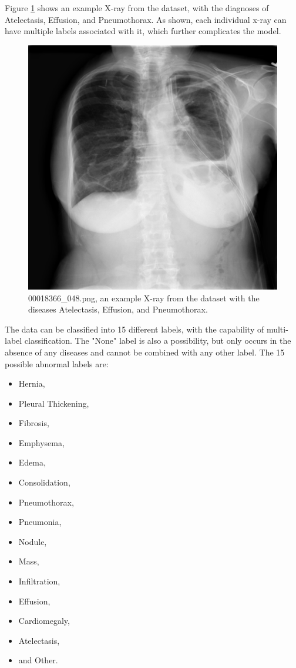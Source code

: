 \documentclass{article}
\theoremstyle{plain}
\theoremstyle{definition}
\theoremstyle{remark}
\begin{document}
Figure \ref{fig:examplexray} shows an example X-ray from the dataset, with the diagnoses of
Atelectasis, Effusion, and Pneumothorax. As shown, each individual x-ray can have multiple labels
associated with it, which further complicates the model.

\begin{figure}[!h]
    \centering
    \includegraphics[scale=0.5]{00018366_048}
    \caption{00018366\_048.png, an example X-ray from the dataset with the diseases Atelectasis,
    Effusion, and Pneumothorax.}
    \label{fig:examplexray}
\end{figure}

The data can be classified into 15 different labels, with the capability of multi-label classification.
The "None" label is also a possibility, but only occurs in the absence of any diseases and cannot be
combined with any other label. The 15 possible abnormal labels are: 
\begin{itemize}
    \item Hernia,
    \item Pleural Thickening,
    \item Fibrosis,
    \item Emphysema,
    \item Edema,
    \item Consolidation,
    \item Pneumothorax,
    \item Pneumonia,
    \item Nodule,
    \item Mass,
    \item Infiltration,
    \item Effusion,
    \item Cardiomegaly,
    \item Atelectasis,
    \item and Other.
\end{itemize}
\end{document}
